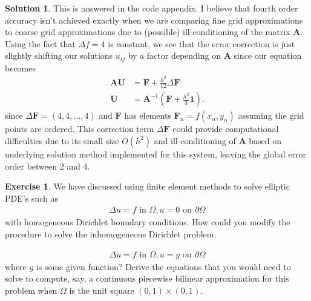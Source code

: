 \documentclass[12pt]{article}
\renewcommand{\vec}[1]{\mathbf{#1}}
\theoremstyle{definition}
\newtheorem{exer}{Exercise}
\newtheorem{sol}{Solution}
\theoremstyle{remark}
\begin{document}
\begin{sol}
    This is answered in the code appendix. I believe that fourth order accuracy isn't achieved exactly when we are comparing fine grid approximations to coarse grid approximations due to (possible) ill-conditioning of the matrix $\vec{A}$. Using the fact that $\Delta f= 4$ is constant, we see that the error correction is just slightly shifting our solutions $u_{ij}$ by a factor depending on $\vec{A}$ since our equation becomes
\begin{align*}
    \vec{A} \vec{U} &= \vec{F} + \frac{h^{2}}{12} \Delta \vec{F}\\
    \vec{U} &= \vec{A}^{-1} \left(  \vec{F} + \frac{h^{2}}{3} \vec{1} \right). 
\end{align*}
since $\Delta \vec{F} = (4,4, \ldots, 4)$ and $\vec{F}$ has elements $\vec{F}_{n} = f(x_{n}, y_{n})$  assuming the grid points are ordered. This correction term $\Delta \vec{F}$ could provide computational difficulties due to its small size $O(h^{2})$ and ill-conditioning of $\vec{A}$ based on underlying solution method implemented for this system, leaving the global error order between 2 and 4. 
\end{sol}

\newpage

\begin{exer}
We have discussed using finite element methods to solve elliptic PDE’s such as 
\begin{align*}
\Delta u = f \text{ in } \Omega, u = 0 \text{ on } \partial \Omega
\end{align*}
with homogeneous Dirichlet boundary conditions. How could you modify the procedure to solve the inhomogeneous Dirichlet problem:

\begin{align*}
    \Delta u = f \text{ in } \Omega, u = g \text{  on } \partial \Omega
\end{align*}
where $g$ is some given function? Derive the equations that you would need to solve to compute, say, a continuous piecewise bilinear approximation for this problem when $\Omega$ is the unit square $(0,1) \times (0,1)$.
\end{exer}
\end{document}
